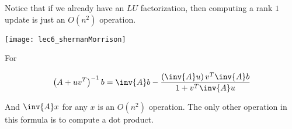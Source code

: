 \documentclass[../main.tex]{subfiles}
\begin{document}
\begin{remark}
    Notice that if we already have an $LU$ factorization, then computing a rank $1$ update is just an $O(n^2)$ operation.
\begin{center}
    \texttt{[image: lec6\_shermanMorrison]}
\end{center}

For 

\[
    \left( A + uv^T \right)^{-1}b = \inv{A}b - \frac{\left( \inv{A}u \right)v^T\inv{A}b}{1 + v^T\inv{A}u}
\]

And $\inv{A}x$ for any $x$ is an $O(n^2)$ operation. The only other operation in this formula is to compute a dot product.
\end{remark}
\end{document}
